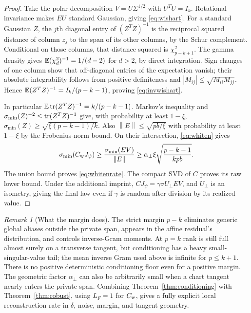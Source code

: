 \documentclass[11pt,a4paper]{article}
\theoremstyle{definition}
\theoremstyle{definition}
\theoremstyle{remark}\newtheorem{remark}[theorem]{Remark}
\newcommand{\smin}{\sigma_{\min}}\newcommand{\smax}{\sigma_{\max}}
\newcommand{\norm}[1]{\left\lVert #1\right\rVert}
\begin{document}
\begin{proof}
Take the polar decomposition $V=U\Sigma^{1/2}$ with $U^TU=I_k$. Rotational invariance makes $EU$ standard Gaussian, giving \eqref{eq:wishart}. For a standard Gaussian $Z$, the $j$th diagonal entry of $(Z^TZ)^{-1}$ is the reciprocal squared distance of column $z_j$ to the span of its other columns, by the Schur complement. Conditional on those columns, that distance squared is $\chi^2_{p-k+1}$. The gamma density gives $\mathbb E(\chi^2_d)^{-1}=1/(d-2)$ for $d>2$, by direct integration. Sign changes of one column show that off-diagonal entries of the expectation vanish; their absolute integrability follows from positive definiteness and $|M_{ij}|\le\sqrt{M_{ii}M_{jj}}$. Hence $\mathbb E(Z^TZ)^{-1}=I_k/(p-k-1)$, proving \eqref{eq:invwishart}.

In particular $\mathbb E\operatorname{tr}(Z^TZ)^{-1}=k/(p-k-1)$. Markov's inequality and $\smin(Z)^{-2}\le\tr(Z^TZ)^{-1}$ give, with probability at least $1-\xi$,
$\smin(Z)\ge\sqrt{\xi(p-k-1)/k}$. Also $\norm E\le\sqrt{pb/\xi}$ with probability at least $1-\xi$ by the Frobenius-norm bound. On their intersection, \eqref{eq:whiten} gives
\[
\smin(C_{\rm w}J_\psi)\ge\frac{\smin(EV)}{\norm E}
\ge\alpha_\perp\xi\sqrt{\frac{p-k-1}{kpb}}.
\]
The union bound proves \eqref{eq:whitenrate}. The compact SVD of $C$ proves its raw lower bound. Under the additional imprint, $CJ_\psi=\gamma\sigma U_\perp EV$, and $U_\perp$ is an isometry, giving the final law even if $\gamma$ is random after division by its realized value.
\end{proof}

\begin{remark}[What the margin does]
The strict margin $p-k$ eliminates generic global aliases outside the private span, appears in the affine residual's distribution, and controls inverse-Gram moments. At $p=k$ rank is still full almost surely on a transverse tangent, but conditioning has a heavy small-singular-value tail; the mean inverse Gram used above is infinite for $p\le k+1$. There is no positive deterministic conditioning floor even for a positive margin. The geometric factor $\alpha_\perp$ can also be arbitrarily small when a chart tangent nearly enters the private span. Combining Theorem~\ref{thm:conditioning} with Theorem~\ref{thm:robust}, using $L_F=1$ for $C_{\rm w}$, gives a fully explicit local reconstruction rate in $\delta$, noise, margin, and tangent geometry.
\end{remark}
\end{document}
